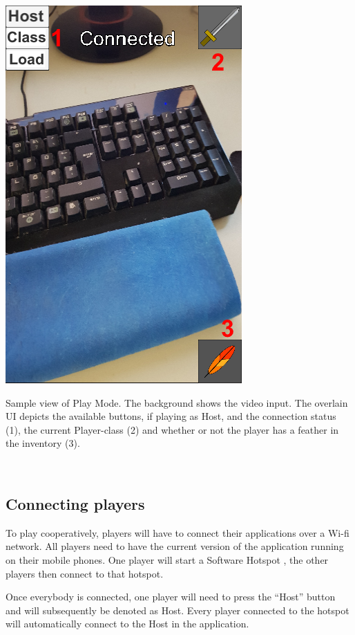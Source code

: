 \documentclass{sigchi-ext}
\begin{document}
\begin{marginfigure}[5pc]
	\begin{minipage}{\marginparwidth}
		\centering
		\includegraphics[width=1\marginparwidth]{figures/PM_Entering}
		\caption{Sample view of Play Mode. The background shows the video input. The overlain UI depicts the available buttons, if playing as Host, and the connection status (1), the current Player-class (2) and whether or not the player has a feather in the inventory (3). }~\label{fig:PM_Entering}
	\end{minipage}
\end{marginfigure}

\subsection{Connecting players}
To play cooperatively, players will have to connect their applications over a Wi-fi network. All players need to have the current version of the application running on their mobile phones. One player will start a Software Hotspot \cite{desc:hotspot}, the other players then connect to that hotspot.

Once everybody is connected, one player will need to press the ``Host'' button and will subsequently be denoted as Host. Every player connected to the hotspot will automatically connect to the Host in the application. 
\end{document}
